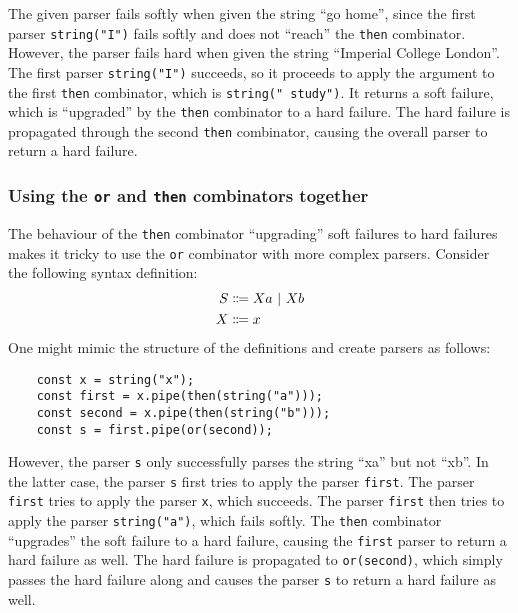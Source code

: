 The given parser fails softly when given the string ``go home'', since the first parser \lstinline{string("I")} fails softly and does not ``reach'' the \lstinline{then} combinator. However, the parser fails hard when given the string ``Imperial College London''. The first parser \lstinline{string("I")} succeeds, so it proceeds to apply the argument to the first \lstinline{then} combinator, which is \lstinline{string(" study")}. It returns a soft failure, which is ``upgraded'' by the \lstinline{then} combinator to a hard failure. The hard failure is propagated through the second \lstinline{then} combinator, causing the overall parser to return a hard failure.

\subsubsection{Using the \lstinline{or} and \lstinline{then} combinators together}
\label{parsing:thenor}
The behaviour of the \lstinline{then} combinator ``upgrading'' soft failures to hard failures makes it tricky to use the \lstinline{or} combinator with more complex parsers. Consider the following syntax definition:
\begin{align*}
    S &\Coloneqq Xa \ |\  Xb \\
    X &\Coloneqq x
\end{align*}
One might mimic the structure of the definitions and create parsers as follows:
\begin{lstlisting}
    const x = string("x");
    const first = x.pipe(then(string("a")));
    const second = x.pipe(then(string("b")));
    const s = first.pipe(or(second));
\end{lstlisting}
However, the parser \lstinline{s} only successfully parses the string ``xa'' but not ``xb''. In the latter case, the parser \lstinline{s} first tries to apply the parser \lstinline{first}. The parser \lstinline{first} tries to apply the parser \lstinline{x}, which succeeds. The parser \lstinline{first} then tries to apply the parser \lstinline{string("a")}, which fails softly. The \lstinline{then} combinator ``upgrades'' the soft failure to a hard failure, causing the \lstinline{first} parser to return a hard failure as well. The hard failure is propagated to \lstinline{or(second)}, which simply passes the hard failure along and causes the parser \lstinline{s} to return a hard failure as well.

